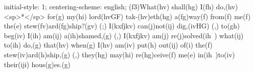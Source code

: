 initial-style: 1;
centering-scheme: english;
(f3)What(hv) shall(hg) I(fh) do,(hv) <sp>*</sp> for(g) my(hi) lord(hvGF) tak-(hv)eth(hg) a(fg)way(f) from(f) me(f) the(e) stew(fv)ard(fg)ship?(gv) (;) I(kxfjkv) can(j)not(ij) dig,(ivHG) (,) to(gh) beg(iv) I(ih) am(ij) a(ih)shamed,(g) (,) I(kxfjkv) am(j) re(j)solved(ih~) what(ij) to(ih) do,(g) that(hv) when(g) I(hv) am(iv) put(h) out(ij) of(i) the(f) stew(iv)ard(h)ship,(g) (,) they(hg) may(hi) re(hg)ceive(f) me(e) in(ih~)to(iv) their(iji) hous(g)es.(g)
